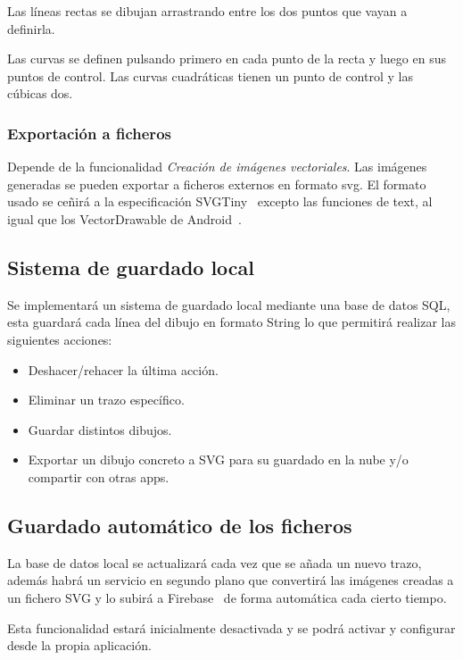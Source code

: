 \documentclass[a4paper,openright,12pt]{article}
\begin{document}
Las líneas rectas se dibujan arrastrando entre los dos puntos que vayan a definirla.

Las curvas se definen pulsando primero en cada punto de la recta y luego en sus puntos de control.
Las curvas cuadráticas tienen un punto de control y las cúbicas dos.

\subsubsection{Exportación a ficheros}
Depende de la funcionalidad \emph{Creación de imágenes vectoriales}.
Las imágenes generadas se pueden exportar a ficheros externos en formato svg. El formato usado se ceñirá a la especificación SVGTiny~\cite{SVGTiny} excepto las funciones de text, al igual que los VectorDrawable de Android~\cite{VectorDrawable}.


\subsection{Sistema de guardado local}
Se implementará un sistema de guardado local mediante una base de datos SQL, esta guardará cada línea del dibujo en formato String lo que permitirá realizar las siguientes acciones:
\begin{itemize}
    \item Deshacer/rehacer la última acción.
    \item Eliminar un trazo específico.
    \item Guardar distintos dibujos.
    \item Exportar un dibujo concreto a SVG para su guardado en la nube y/o compartir con otras apps.
\end{itemize}


\subsection{Guardado automático de los ficheros}
La base de datos local se actualizará cada vez que se añada un nuevo trazo, además habrá un servicio en segundo plano que convertirá las imágenes creadas a un fichero SVG y lo subirá a Firebase~\cite{Firebase} de forma automática cada cierto tiempo. 

Esta funcionalidad estará inicialmente desactivada y se podrá activar y configurar desde la propia aplicación.

\end{document}
